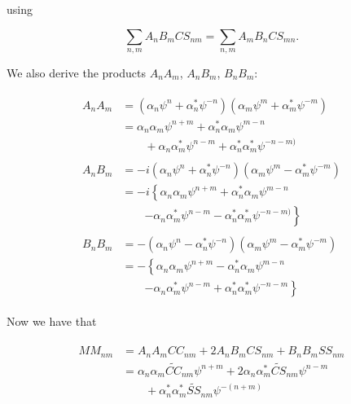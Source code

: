 \documentclass{aastex62}
\newcommand{\CCt}{\widetilde{CC}}
\newcommand{\CSt}{\widetilde{CS}}
\newcommand{\SSt}{\widetilde{SS}}
\newcommand{\eith}{\psi}
\begin{document}
\noindent using

\begin{equation}
\sum_{n,m}A_nB_mCS_{nm} = \sum_{n,m} A_mB_n CS_{mn}.
\end{equation}

We also derive the products $A_nA_m$, $A_nB_m$, $B_nB_m$:


\begin{align}
\begin{split}
A_nA_m &= \left(\alpha_n\eith^n + \alpha^{*}_n\eith^{-n}\right)\left(\alpha_m\eith^m + \alpha^{*}_m\eith^{-m}\right)\\
       &= \alpha_n\alpha_m \eith^{n+m} + \alpha^{*}_n\alpha_m\eith^{m-n} \\
       &\qquad + \alpha_n\alpha^{*}_m \eith^{n-m} + \alpha^{*}_n\alpha^{*}_m\eith^{-n-m)}
\end{split}\\
\begin{split}
A_nB_m &= -i\left(\alpha_n\eith^n + \alpha^{*}_n\eith^{-n}\right)\left(\alpha_m\eith^m - \alpha^{*}_m\eith^{-m}\right)\\
       &= -i\left\{\alpha_n\alpha_m \eith^{n+m} + \alpha^{*}_n\alpha_m\eith^{m-n} \right.\\
       &\qquad \left. - \alpha_n\alpha^{*}_m \eith^{n-m} - \alpha^{*}_n\alpha^{*}_m\eith^{-n-m)}\right\}
\end{split}\\
\begin{split}
B_nB_m &= -\left(\alpha_n\eith^n - \alpha^{*}_n\eith^{-n}\right)\left(\alpha_m\eith^m - \alpha^{*}_m\eith^{-m}\right)\\
       &= -\left\{\alpha_n\alpha_m \eith^{n+m} - \alpha^{*}_n\alpha_m\eith^{m-n} \right.\\
       &\qquad \left.- \alpha_n\alpha^{*}_m \eith^{n-m} + \alpha^{*}_n\alpha^{*}_m\eith^{-n-m}\right\}
\end{split}
\end{align}


Now we have that

\begin{align}
\begin{split}
MM_{nm} &= A_nA_mCC_{nm} + 2A_nB_mCS_{nm} + B_nB_mSS_{nm}\\
        &= \alpha_n\alpha_m\CCt_{nm}\eith^{n+m} + 2\alpha_n\alpha^{*}_m\CSt_{nm}\eith^{n-m} \\
        &\qquad + \alpha^{*}_n\alpha^{*}_m\SSt_{nm}\eith^{-(n+m)}
\end{split}
\end{align}
\end{document}
